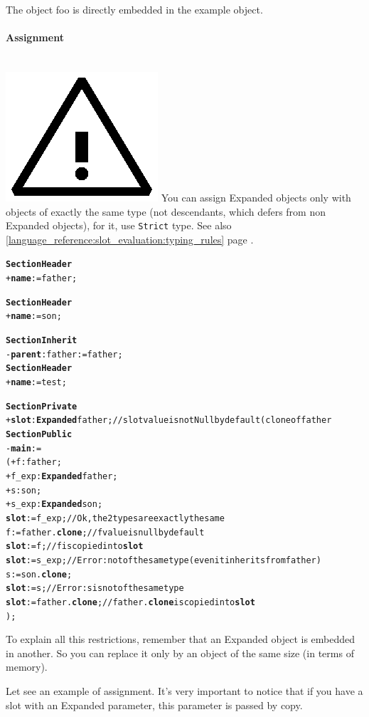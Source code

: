 \documentclass[11pt]{mybook}
\newcommand{\warning}{\includegraphics[scale=0.3]{figures/warning}}
\begin{document}
The object {\sc{}foo} is directly embedded in the {\sc{}example} object.

\paragraph{Assignment}  
~\\
\warning{} You can assign Expanded objects only with objects of exactly the 
same type (not descendants, which defers from non Expanded objects), for it, use {\tt{}Strict} type. 
See also \ref{language_reference:slot_evaluation:typing_rules} 
page \pageref{language_reference:slot_evaluation:typing_rules}.

\begin{alltt}
{\bf{}Section Header}
  + {\bf{}name} := {\sc{}father};

{\bf{}Section Header}
  + {\bf{}name} := {\sc{}son};

{\bf{}Section Inherit}
  - {\bf{}parent}:{\sc{}father} := {\sc{}father};\\

{\bf{}Section Header}
  + {\bf{}name} := {\sc{}test};

{\bf{}Section Private}
  + {\bf{}slot}:{\bf{}Expanded} {\sc{}father}; // slot value is not Null by default (clone of {\sc{}father}
{\bf{}Section Public}
  - {\bf{}main} :=
  ( + f:{\sc{}father};
    + f_exp:{\bf{}Expanded} {\sc{}father};
    + s:{\sc{}son};
    + s_exp:{\bf{}Expanded} {\sc{}son};
    {\bf{}slot} := f_exp; // Ok, the 2 types are exactly the same
    f := {\sc{}father}.{\bf{}clone}; // f value is {\sc{}null} by default
    {\bf{}slot} := f;     // f is copied into {\bf{}slot}
    {\bf{}slot} := s_exp; // Error: not of the same type (even it inherits from {\sc{}father})
    s := {\sc{}son}.{\bf{}clone}; 
    {\bf{}slot} := s;     // Error: s is not of the same type
    {\bf{}slot} := {\sc{}father}.{\bf{}clone}; // {\sc{}father}.{\bf{}clone} is copied into {\bf{}slot}
  );
\end{alltt}
To explain all this restrictions, remember that an Expanded object is embedded in another. So you can replace it only by an object of the same size (in terms of memory).

Let see an example of assignment. It's very important to notice that if you have a slot with an Expanded parameter, this parameter is passed by copy.
\end{document}
